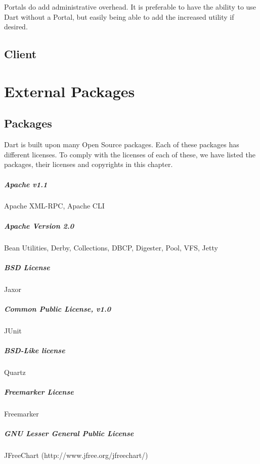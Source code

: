 \documentclass{InsightBook}
\begin{document}
Portals do add administrative overhead.  It is preferable to
have the ability to use Dart without a Portal, but easily being able
to add the increased utility if desired.


\section{Client}

\chapter{External Packages}
\section{Packages}
Dart is built upon many Open Source packages.  Each of these packages has different licenses.  To comply with the licenses of each of these, we have listed the packages, their licenses and copyrights in this chapter.

\paragraph{Apache v1.1}
Apache XML-RPC, Apache CLI

\paragraph{Apache Version 2.0}
Bean Utilities, Derby, Collections, DBCP, Digester, Pool, VFS, Jetty

\paragraph{BSD License}
Jaxor

\paragraph{Common Public License, v1.0}
JUnit

\paragraph{BSD-Like license}
Quartz 

\paragraph{Freemarker License}
Freemarker

\paragraph{GNU Lesser General Public License}
JFreeChart (http://www.jfree.org/jfreechart/)
\end{document}
